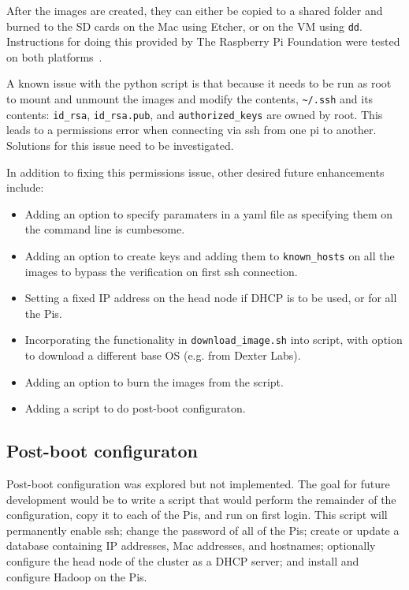 After the images are created, they can either be copied to a shared
folder and burned to the SD cards on the Mac using Etcher, or on the
VM using \verb|dd|. Instructions for doing this provided by The
Raspberry Pi Foundation were tested on both
platforms~\cite{hid-sp18-419-raspbian-burn}.

A known issue with the python script is that because it needs to be
run as root to mount and unmount the images and modify the
contents, \verb|~/.ssh| and its contents: \verb|id_rsa|,
\verb|id_rsa.pub|, and \verb|authorized_keys| are owned by root.
This leads to a permissions error when connecting via ssh from one pi
to another. Solutions for this issue need to be investigated.

In addition to fixing this permissions issue, other desired future
enhancements include:

\begin{itemize}
        \item Adding an option to specify paramaters in a yaml file as
        specifying them on the command line is cumbesome.
        \item Adding an option to create keys and adding them
        to \verb|known_hosts| on all the images to bypass the
        verification on first ssh connection.
        \item Setting a fixed
        IP address on the head node if DHCP is to be used, or for all
        the Pis.
        \item Incorporating the functionality
        in \verb|download_image.sh| into script, with option to
        download a different base OS (e.g. from Dexter Labs).
        \item Adding an option to burn the images from the script.
        \item Adding a script to do post-boot configuraton.
\end{itemize}

\subsection{Post-boot configuraton}
Post-boot configuration was explored but not implemented. The goal for
future development would be to write a script that would perform the
remainder of the configuration, copy it to each of the Pis, and run on
first login. This script will permanently enable ssh; change the
password of all of the Pis; create or update a database containing IP
addresses, Mac addresses, and hostnames; optionally configure the head
node of the cluster as a DHCP server; and install and configure Hadoop
on the Pis.

